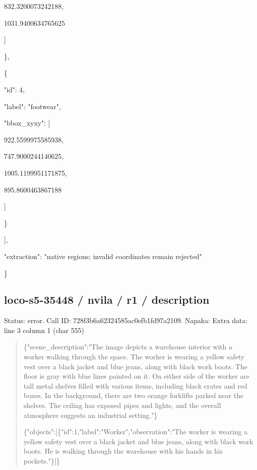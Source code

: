 \documentclass[10pt,a4paper]{article}
\begin{document}
        832.3200073242188,\allowbreak{}\par
        1031.9400634765625\par
      ]\par
    \},\allowbreak{}\par
    \{\par
      "id":\allowbreak{} 4,\allowbreak{}\par
      "label":\allowbreak{} "footwear",\allowbreak{}\par
      "bbox\_xyxy":\allowbreak{} [\par
        922.5599975585938,\allowbreak{}\par
        747.9000244140625,\allowbreak{}\par
        1005.1199951171875,\allowbreak{}\par
        895.8600463867188\par
      ]\par
    \}\par
  ],\allowbreak{}\par
  "extraction":\allowbreak{} "native regions; invalid coordinates remain rejected"\par
\}
\subsection*{loco-s5-35448 / nvila / r1 / description}
Status: error. Call ID: 728f3b6a62324585ac0efb1fd97a2109. Napaka: Extra data: line 3 column 1 (char 555)
\begin{quote}\footnotesize
\{"scene\_description":\allowbreak{}"The image depicts a warehouse interior with a worker walking through the space. The worker is wearing a yellow safety vest over a black jacket and blue jeans,\allowbreak{} along with black work boots. The floor is gray with blue lines painted on it. On either side of the worker are tall metal shelves filled with various items,\allowbreak{} including black crates and red boxes. In the background,\allowbreak{} there are two orange forklifts parked near the shelves. The ceiling has exposed pipes and lights,\allowbreak{} and the overall atmosphere suggests an industrial setting."\}\par
\par
\{"objects":\allowbreak{}[\{"id":\allowbreak{}1,\allowbreak{}"label":\allowbreak{}"Wor\allowbreak{}ker",\allowbreak{}"observation":\allowbreak{}"The worker is wearing a yellow safety vest over a black jacket and blue jeans,\allowbreak{} along with black work boots. He is walking through the warehouse with his hands in his pockets."\}]\}
\end{quote}
\end{document}
